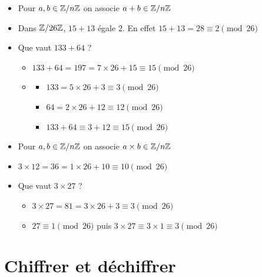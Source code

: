 \begin{frame}

\pause
\begin{itemize}
  \item Pour $a,b \in \mathbb{Z}/n\mathbb{Z}$ on associe $a+b \in \mathbb{Z}/n\mathbb{Z}$
\pause  
  \item Dans $\mathbb{Z}/26\mathbb{Z}$, $15+13$ égale $2$\pause. En effet $15+13 = 28 \equiv 2 \pmod{26}$
\pause  
  \item Que vaut $133+64$ ? 
\pause 
  \begin{itemize}
    \item $133+64 = 197=7\times 26 +15 \equiv 15 \pmod {26}$
\pause    
    \item 
    \begin{itemize}
    \item $133 = 5 \times 26 + 3 \equiv 3 \pmod {26}$
    \pause    
    \item $64 = 2 \times 26 + 12 \equiv 12 \pmod{26}$
    \pause    
    \item $133 + 64 \equiv 3 + 12 \equiv 15 \pmod{26}$
    \end{itemize}
  \end{itemize}

\end{itemize}

\bigskip
\pause


\begin{itemize}
  \item Pour $a,b \in \mathbb{Z}/n\mathbb{Z}$ on associe $a \times b \in \mathbb{Z}/n\mathbb{Z}$
\pause 
  \item $3\times 12 = 36 = 1 \times 26 + 10 \equiv 10 \pmod{26}$
\pause  
  \item Que vaut $3\times 27$ ? 
  \begin{itemize}
  \item $3 \times 27 = 81 = 3 \times 26 + 3 \equiv 3 \pmod{26}$
  \pause  
  \item $27 \equiv 1 \pmod{26}$ puis $3 \times 27 \equiv 3 \times 1 \equiv 3 \pmod{26}$ 
  \end{itemize}
\end{itemize}


\end{frame}



\section{Chiffrer et déchiffrer}

